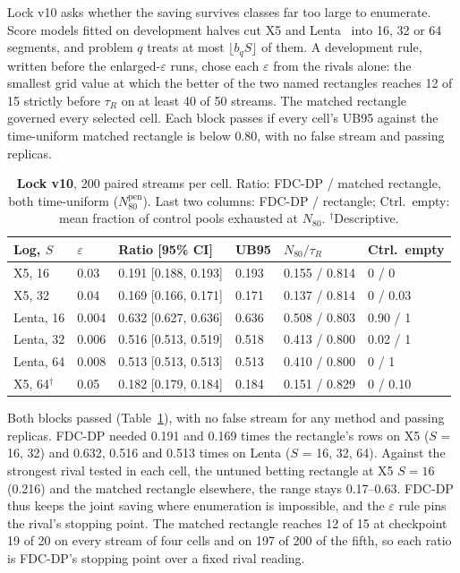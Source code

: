 \documentclass[sigconf,anonymous,review]{acmart}
\newcommand{\eps}{\varepsilon}
\newcommand{\Npen}{N_{80}^{\text{pen}}}
\begin{document}
Lock v10 asks whether the saving survives classes far too large to enumerate. Score models fitted on development halves cut X5 and Lenta~\citep{scikituplift2020} into 16, 32 or 64 segments, and problem $q$ treats at most $\lfloor b_q S \rfloor$ of them. A development rule, written before the enlarged-$\eps$ runs, chose each $\eps$ from the rivals alone: the smallest grid value at which the better of the two named rectangles reaches 12 of 15 strictly before $\tau_R$ on at least 40 of 50 streams. The matched rectangle governed every selected cell. Each block passes if every cell's UB95 against the time-uniform matched rectangle is below 0.80, with no false stream and passing replicas.

\begin{table}[t]
\caption{\textbf{Lock v10}, 200 paired streams per cell. Ratio: FDC-DP / matched rectangle, both time-uniform ($\Npen$). Last two columns: FDC-DP / rectangle; Ctrl.\ empty: mean fraction of control pools exhausted at $N_{80}$. $^\dagger$Descriptive.}
\label{tab:scale}
\small
\setlength{\tabcolsep}{2.6pt}
\begin{tabular}{@{}llllll@{}}
\toprule
Log, $S$ & $\eps$ & Ratio [95\% CI] & UB95 & $N_{80}/\tau_R$ & Ctrl.\ empty \\
\midrule
X5, 16 & 0.03 & 0.191 [0.188, 0.193] & 0.193 & 0.155 / 0.814 & 0 / 0 \\
X5, 32 & 0.04 & 0.169 [0.166, 0.171] & 0.171 & 0.137 / 0.814 & 0 / 0.03 \\
Lenta, 16 & 0.004 & 0.632 [0.627, 0.636] & 0.636 & 0.508 / 0.803 & 0.90 / 1 \\
Lenta, 32 & 0.006 & 0.516 [0.513, 0.519] & 0.518 & 0.413 / 0.800 & 0.02 / 1 \\
Lenta, 64 & 0.008 & 0.513 [0.513, 0.513] & 0.513 & 0.410 / 0.800 & 0 / 1 \\
X5, 64$^\dagger$ & 0.05 & 0.182 [0.179, 0.184] & 0.184 & 0.151 / 0.829 & 0 / 0.10 \\
\bottomrule
\end{tabular}
\end{table}

Both blocks passed (Table~\ref{tab:scale}), with no false stream for any method and passing replicas. FDC-DP needed 0.191 and 0.169 times the rectangle's rows on X5 ($S$ = 16, 32) and 0.632, 0.516 and 0.513 times on Lenta ($S$ = 16, 32, 64). Against the strongest rival tested in each cell, the untuned betting rectangle at X5 $S = 16$ (0.216) and the matched rectangle elsewhere, the range stays 0.17--0.63. FDC-DP thus keeps the joint saving where enumeration is impossible, and the $\eps$ rule pins the rival's stopping point. The matched rectangle reaches 12 of 15 at checkpoint 19 of 20 on every stream of four cells and on 197 of 200 of the fifth, so each ratio is FDC-DP's stopping point over a fixed rival reading.
\end{document}
